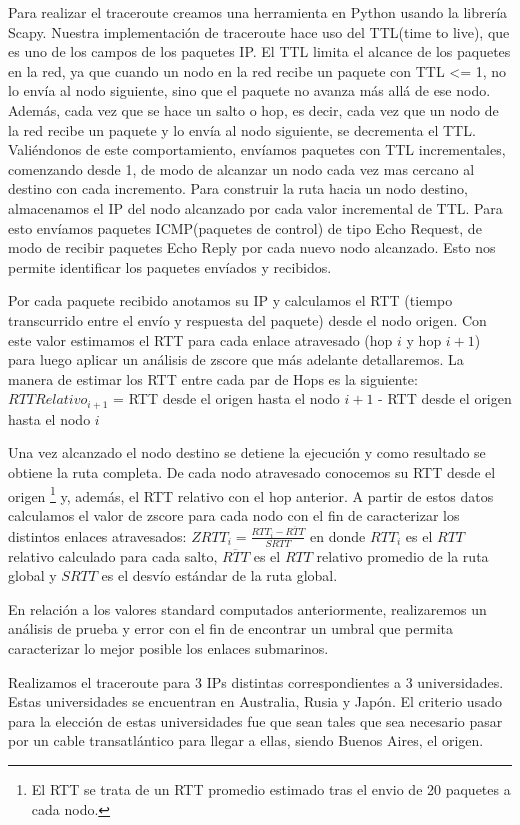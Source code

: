 Para realizar el traceroute creamos una herramienta en Python usando la librería Scapy. 
Nuestra implementación de traceroute hace uso del TTL(time to live), que es uno de los campos de los paquetes IP. El TTL limita el alcance de los paquetes en la red, ya que cuando un nodo en la red recibe un paquete con TTL <= 1, no lo envía al nodo siguiente, sino que el paquete no avanza más allá de ese nodo. Además, cada vez que se hace un salto o hop, es decir, cada vez que un nodo de la red recibe un paquete y lo envía al nodo siguiente, se decrementa el TTL. Valiéndonos de este comportamiento, envíamos paquetes con TTL incrementales, comenzando desde 1, de modo de alcanzar un nodo cada vez mas cercano al destino con cada incremento.
Para construir la ruta hacia un nodo destino, almacenamos el IP del nodo alcanzado por cada valor incremental de TTL. Para esto envíamos paquetes ICMP(paquetes de control) de tipo Echo Request, de modo de recibir paquetes Echo Reply por cada nuevo nodo alcanzado. Esto nos permite identificar los paquetes envíados y recibidos. 

Por cada paquete recibido anotamos su IP y calculamos el RTT (tiempo transcurrido entre el envío y respuesta del paquete) desde el nodo origen. Con este valor estimamos el RTT para cada enlace atravesado (hop $i$ y hop $i+1$) para luego aplicar un análisis de zscore que más adelante detallaremos. La manera de estimar los RTT entre cada par de Hops es la siguiente:
\newline
$RTTRelativo_{i+1}$ = RTT desde el origen hasta el nodo $i+1$ - RTT desde el origen hasta el nodo $i$
\newline

Una vez alcanzado el nodo destino se detiene la ejecución y como resultado se obtiene la ruta completa. De cada nodo atravesado conocemos su RTT desde el origen \footnote{El RTT se trata de un RTT promedio estimado tras el envio de 20 paquetes a cada nodo.} y, además, el RTT relativo con el hop anterior. A partir de estos datos calculamos el valor de zscore para cada nodo con el fin de caracterizar los distintos enlaces atravesados:
\newline
\newline
$ZRTT_i = \frac{RTT_i-\overline{RTT}}{SRTT}$
en donde $RTT_i$ es el $RTT$ relativo calculado para cada salto, $\overline{RTT}$ es el $RTT$ relativo promedio de la ruta global y $SRTT$ es el desvío estándar de la ruta global.
\newline

En relación a los valores standard computados anteriormente, realizaremos un análisis de prueba y error con el fin de encontrar un umbral que permita caracterizar lo mejor posible los enlaces submarinos.

Realizamos el traceroute para 3 IPs distintas correspondientes a 3 universidades. Estas universidades se encuentran en Australia, Rusia y Japón. El criterio usado para la elección de estas universidades fue que sean tales que sea necesario pasar por un cable transatlántico para llegar a ellas, siendo Buenos Aires, el origen.